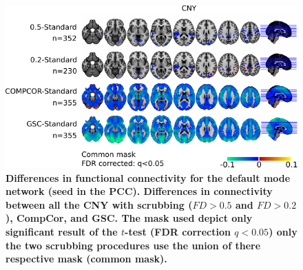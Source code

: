 \documentclass[authoryear]{elsarticle}
\begin{document}
\pagebreak

\begin{figure}[!ht]
\begin{center}
\includegraphics[width=\linewidth]{../figures/figure_comp_cny.pdf}
\end{center}
\caption{
{\bf Differences in functional connectivity for the default mode network (seed in the PCC). Differences in connectivity between all the CNY with scrubbing ($FD>0.5$ and $FD>0.2$), CompCor, and GSC. The mask used depict only significant result of the $t$-test (FDR correction $q<0.05$) only the two scrubbing procedures use the union of there respective mask (common mask).}
}
\label{fig_sup_scrubbimpact_cny}
\end{figure}
\end{document}
